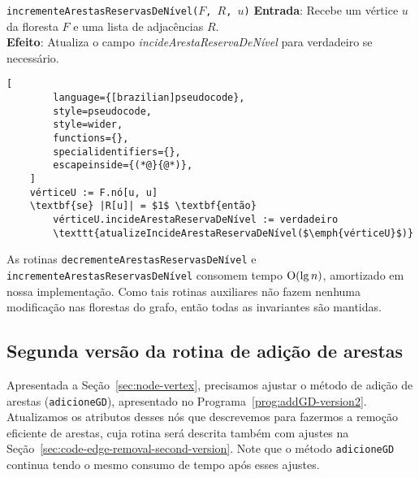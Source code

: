 \begin{programruledcaption}{\texttt{incrementeArestasReservasDeNível($F$, $R$, $u$)} \label{prog:incrementReserveEdgesCount-GD}}
    \noindent\textbf{Entrada}: Recebe um vértice $u$ da floresta $F$ e uma lista de adjacências $R$.\\
    \noindent\textbf{Efeito}: Atualiza o campo \textit{incideArestaReservaDeNível} para verdadeiro se necessário.
    \vspace{-0.5\baselineskip}
    \begin{lstlisting}[
        language={[brazilian]pseudocode},
        style=pseudocode,
        style=wider,
        functions={},
        specialidentifiers={},
        escapeinside={(*@}{@*)},
    ]
    vérticeU := F.nó[u, u]
    \textbf{se} |R[u]| = $1$ \textbf{então} 
        vérticeU.incideArestaReservaDeNível := verdadeiro
        \texttt{atualizeIncideArestaReservaDeNível($\emph{vérticeU}$)}
    \end{lstlisting}
    \vspace{-0.5\baselineskip}
\end{programruledcaption}


As rotinas \texttt{decrementeArestasReservasDeNível} e \texttt{incrementeArestasReservasDeNível} consomem tempo $\mathrm{O}(\lg n)$, amortizado em nossa implementação. Como tais rotinas auxiliares não fazem nenhuma modificação nas florestas do grafo, então todas as invariantes são mantidas. 

\subsection{Segunda versão da rotina de adição de arestas}
\label{sec:code-edge-addition-second-version}

Apresentada a Seção~\ref{sec:node-vertex}, precisamos ajustar o método de adição de arestas (\texttt{adicioneGD}), apresentado no Programa~\ref{prog:addGD-version2}. Atualizamos os atributos desses nós que descrevemos para fazermos a remoção eficiente de arestas, cuja rotina será descrita também com ajustes na Seção~\ref{sec:code-edge-removal-second-version}. Note que o método \texttt{adicioneGD} continua tendo o mesmo consumo de tempo após esses ajustes. 

